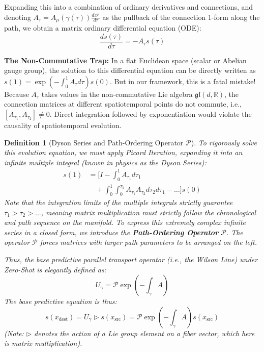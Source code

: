 \documentclass{article}
\newtheorem{definition}{Definition}[section]
\begin{document}
Expanding this into a combination of ordinary derivatives and connections, and denoting $A_\tau = A_\mu(\gamma(\tau)) \frac{dx^\mu}{d\tau}$ as the pullback of the connection 1-form along the path, we obtain a matrix ordinary differential equation (ODE):
\begin{equation}
\frac{ds(\tau)}{d\tau} = -A_\tau s(\tau)
\end{equation}

\noindent\textbf{The Non-Commutative Trap:} In a flat Euclidean space (scalar or Abelian gauge group), the solution to this differential equation can be directly written as $s(1) = \exp(-\int_0^1 A_\tau d\tau) s(0)$. But in our framework, this is a fatal mistake! Because $A_\tau$ takes values in the non-commutative Lie algebra $\mathfrak{gl}(d, \mathbb{R})$, the connection matrices at different spatiotemporal points do not commute, i.e., $[A_{\tau_1}, A_{\tau_2}] \neq 0$. Direct integration followed by exponentiation would violate the causality of spatiotemporal evolution.

\begin{definition}[Dyson Series and Path-Ordering Operator $\mathcal{P}$]
To rigorously solve this evolution equation, we must apply Picard Iteration, expanding it into an infinite multiple integral (known in physics as the Dyson Series):
\begin{equation}
\begin{split}
s(1) &= \bigg[ I - \int_0^1 A_{\tau_1} d\tau_1 \\
&\quad + \int_0^1 \int_0^{\tau_1} A_{\tau_1} A_{\tau_2} d\tau_2 d\tau_1 - \dots \bigg] s(0)
\end{split}
\end{equation}
Note that the integration limits of the multiple integrals strictly guarantee $\tau_1 > \tau_2 > \dots$, meaning matrix multiplication must strictly follow the chronological and path sequence on the manifold. To express this extremely complex infinite series in a closed form, we introduce the \textbf{Path-Ordering Operator} $\mathcal{P}$. The operator $\mathcal{P}$ forces matrices with larger path parameters to be arranged on the left.

Thus, the base predictive parallel transport operator (i.e., the Wilson Line) under Zero-Shot is elegantly defined as:
\begin{equation}
U_\gamma = \mathcal{P}\exp \left( -\int_\gamma A \right)
\end{equation}
The base predictive equation is thus:
\begin{equation}
s(x_{\text{dest}}) = U_\gamma \triangleright s(x_{\text{src}}) = \mathcal{P}\exp \left( -\int_\gamma A \right) s(x_{\text{src}})
\end{equation}
(Note: $\triangleright$ denotes the action of a Lie group element on a fiber vector, which here is matrix multiplication).
\end{definition}
\end{document}
